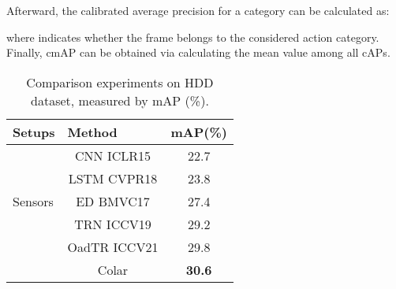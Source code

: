 \documentclass[10pt,twocolumn,letterpaper]{article}
\begin{document}
Afterward, the calibrated average precision  for a category can be calculated as:

where  indicates whether the  frame belongs to the considered action category. Finally, cmAP can be obtained via calculating the mean value among all cAPs.


\begin{table}[thbp]
  \centering
  \caption{Comparison experiments on HDD dataset, measured by mAP (\%).}
  \setlength{\tabcolsep}{8pt}
    \begin{tabular}{rc|c}
    \toprule
    \toprule
    \multicolumn{1}{l}{Setups} & \multicolumn{1}{l|}{Method} & \multicolumn{1}{l}{mAP(\%)} \\
    \midrule
    \midrule
          & CNN \cite{de2016online}{\scriptsize ICLR15} & 22.7 \\
          & LSTM \cite{ramanishka2018toward}{\scriptsize CVPR18} & 23.8 \\
    \multicolumn{1}{l}{Sensors} & ED \cite{gao2017red}{\scriptsize BMVC17} & 27.4 \\
          & TRN \cite{xu2019temporal}{\scriptsize ICCV19} & 29.2 \\
          & OadTR \cite{wang2021oadtr}{\scriptsize ICCV21} & 29.8 \\
          & Colar & \textbf{30.6} \\
    \bottomrule
    \end{tabular}\label{tabCmpHDD}\end{table}
\end{document}
